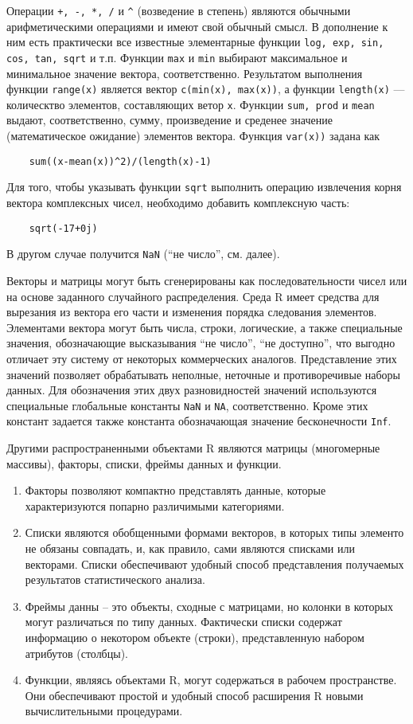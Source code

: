 \documentclass[12pt, openany, twoside]{book} %
\begin{document}
Операции \texttt{+, -, *, /} и \texttt{\^} (возведение в степень) являются обычными арифметическими операциями и имеют свой обычный смысл. В дополнение к ним есть практически все известные элементарные функции \texttt{log, exp, sin, cos, tan, sqrt} и т.п. Функции \texttt{max} и \texttt{min} выбирают  максимальное и минимальное значение вектора, соответственно. Результатом выполнения функции \texttt{range(x)} является вектор \texttt{c(min(x), max(x))}, а функции \texttt{length(x)} --- колическтво элементов, составляющих ветор \texttt{x}. Функции \texttt{sum, prod} и \texttt{mean} выдают, соответственно, сумму, произведение и среденее значение (математическое ожидание) элементов вектора. Функция \texttt{var(x))} задана как
{\tt\begin{verbatim}
	sum((x-mean(x))^2)/(length(x)-1)
\end{verbatim}}

Для того, чтобы указывать функции \texttt{sqrt} выполнить операцию извлечения корня вектора комплексных чисел, необходимо добавить комплексную часть:
{\tt\begin{verbatim}
	sqrt(-17+0j)
\end{verbatim}}
В другом случае получится \texttt{NaN} (``не число'', см. далее).

Векторы и матрицы могут быть сгенерированы как последовательности чисел или на основе заданного случайного распределения. Среда R имеет средства для вырезания из вектора его части и изменения порядка следования элементов.
Элементами вектора могут быть числа, строки, логические, а также специальные значения, обозначающие высказывания ``не число'', ``не доступно'', что выгодно отличает эту систему от некоторых коммерческих аналогов. Представление этих значений позволяет обрабатывать неполные, неточные и противоречивые наборы данных. Для обозначения этих двух разновидностей значений используются специальные глобальные константы \texttt{NaN} и \texttt{NA}, соответственно. Кроме этих констант задается также константа обозначающая значение бесконечности \texttt{Inf}.

Другими распространенными объектами R являются матрицы (многомерные массивы), факторы, списки, фреймы данных и функции.
\begin{enumerate}
\item Факторы позволяют компактно представлять данные, которые характеризуются попарно различимыми категориями.
\item Списки являются обобщенными формами векторов, в которых типы элементо не обязаны совпадать, и, как правило, сами являются списками или векторами. Списки обеспечивают удобный способ представления получаемых результатов статистического анализа.
\item Фреймы данны – это объекты, сходные с матрицами, но колонки в которых могут различаться по типу данных. Фактически списки содержат информацию о некотором объекте (строки), представленную набором атрибутов (столбцы).
\item Функции, являясь объектами R, могут содержаться в рабочем пространстве. Они обеспечивают простой и удобный способ расширения R новыми вычислительными процедурами.
\end{enumerate}
\end{document}
